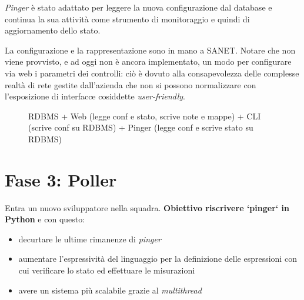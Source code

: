 \documentclass[a4wide,10pt,italian]{manual}
\begin{document}
\emph{Pinger} è stato adattato per leggere la nuova configurazione dal database e continua la sua attività come strumento di monitoraggio e quindi di aggiornamento dello stato.

La configurazione e la rappresentazione sono in mano a SANET. Notare che non viene provvisto, e ad oggi non è ancora implementato, un modo per configurare via web i parametri dei controlli: ciò è dovuto alla consapevolezza delle complesse realtà di rete gestite dall'azienda che non si possono normalizzare con l'esposizione di interfacce cosiddette \emph{user-friendly}.
\hypertarget{dev-second-architecture}{}\begin{figure}[htbp]
\centering

\caption{RDBMS + Web (legge conf e stato, scrive note e mappe) + CLI (scrive conf su RDBMS) + Pinger (legge conf e scrive stato su RDBMS)}\end{figure}


\section{Fase 3: Poller}

Entra un nuovo sviluppatore nella squadra. \textbf{Obiettivo riscrivere {}`pinger{}` in Python} e con questo:
\begin{itemize}
\item {} 
decurtare le ultime rimanenze di \emph{pinger}

\item {} 
aumentare l'espressività del linguaggio per la definizione delle espressioni con cui verificare lo stato ed effettuare le misurazioni

\item {} 
avere un sistema più scalabile grazie al \emph{multithread}

\end{itemize}
\end{document}
